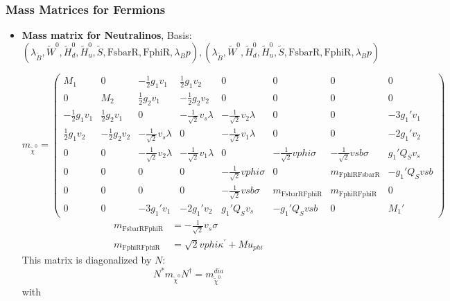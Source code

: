 \subsubsection{Mass Matrices for Fermions}
\begin{itemize} 
\item {\bf Mass matrix for Neutralinos}, Basis: \( \left(\lambda_{\tilde{B}}, \tilde{W}^0, \tilde{H}_d^0, \tilde{H}_u^0, \tilde{S}, \text{FsbarR}, \text{FphiR}, \lambda_Bp\right), \left(\lambda_{\tilde{B}}, \tilde{W}^0, \tilde{H}_d^0, \tilde{H}_u^0, \tilde{S}, \text{FsbarR}, \text{FphiR}, \lambda_Bp\right) \) 
 
\begin{equation} 
m_{\tilde{\chi}^0} = \left( 
\begin{array}{cccccccc}
M_1 &0 &-\frac{1}{2} g_1 v_1  &\frac{1}{2} g_1 v_2  &0 &0 &0 &0\\ 
0 &M_2 &\frac{1}{2} g_2 v_1  &-\frac{1}{2} g_2 v_2  &0 &0 &0 &0\\ 
-\frac{1}{2} g_1 v_1  &\frac{1}{2} g_2 v_1  &0 &- \frac{1}{\sqrt{2}} v_s \lambda  &- \frac{1}{\sqrt{2}} v_2 \lambda  &0 &0 &-3 g_1' v_1 \\ 
\frac{1}{2} g_1 v_2  &-\frac{1}{2} g_2 v_2  &- \frac{1}{\sqrt{2}} v_s \lambda  &0 &- \frac{1}{\sqrt{2}} v_1 \lambda  &0 &0 &-2 g_1' v_2 \\ 
0 &0 &- \frac{1}{\sqrt{2}} v_2 \lambda  &- \frac{1}{\sqrt{2}} v_1 \lambda  &0 &- \frac{1}{\sqrt{2}} vphi \sigma  &- \frac{1}{\sqrt{2}} vsb \sigma  &g_1' Q_{S} v_s \\ 
0 &0 &0 &0 &- \frac{1}{\sqrt{2}} vphi \sigma  &0 &m_{\text{FphiR}\text{FsbarR}} &- g_1' Q_{S} vsb \\ 
0 &0 &0 &0 &- \frac{1}{\sqrt{2}} vsb \sigma  &m_{\text{FsbarR}\text{FphiR}} &m_{\text{FphiR}\text{FphiR}} &0\\ 
0 &0 &-3 g_1' v_1  &-2 g_1' v_2  &g_1' Q_{S} v_s  &- g_1' Q_{S} vsb  &0 &M_1'\end{array} 
\right) 
 \end{equation} 
\begin{align} 
m_{\text{FsbarR}\text{FphiR}} &= - \frac{1}{\sqrt{2}} v_s \sigma \\ 
m_{\text{FphiR}\text{FphiR}} &= \sqrt{2} vphi \kappa^\prime  + Mu_{phi}
\end{align} 
This matrix is diagonalized by \(N\): 
\begin{equation} 
N^* m_{\tilde{\chi}^0} N^{\dagger} = m^{dia}_{\tilde{\chi}^0} 
\end{equation} 
with 
\begin{align} 

\end{align}
\end{itemize}
